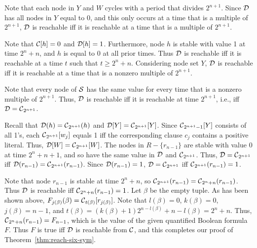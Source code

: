\smallskip

Note that each node in $Y$ and $W$ cycles with a period that divides $2^{n+1}$.
Since $\mbox{$\mathcal{D}$}$ has all nodes in $Y$ equal to 0, 
and this only occurs at a time that is a multiple of $2^{n+1}$,
$\mbox{$\mathcal{D}$}$ is reachable  iff it is reachable at a time that is a multiple of $2^{n+1}$.

Note that $\mbox{$\mathcal{C}$}[h]=0$ and $\mbox{$\mathcal{D}$}[h]=1$.  Furthermore, node $h$ is
stable with value 1 at time $2^n+n$, and $h$ is equal to 0 at all
prior times.  Thus $\mbox{$\mathcal{D}$}$ is reachable iff it is reachable at a
time $t$ such that $t \geq 2^n+n$.  Considering node set $Y$, $\mbox{$\mathcal{D}$}$
is reachable iff it is reachable  at a time that is a nonzero
multiple of $2^{n+1}$.

Note that every node of $\mbox{$\mathcal{S}$}$ 
has the same value for every time that is a  nonzero multiple of $2^{n+1}$.
Thus, $\mbox{$\mathcal{D}$}$ is reachable  iff it is reachable at time $2^{n+1}$,
i.e., iff $\mbox{$\mathcal{D}$} = \mbox{$\mathcal{C}$}_{2^{n+1}}$.

Recall that $\mbox{$\mathcal{D}$}(h) = \mbox{$\mathcal{C}$}_{2^{n+1}}(h)$ and $\mbox{$\mathcal{D}$}[Y] = \mbox{$\mathcal{C}$}_{2^{n+1}}[Y]$.
Since $\mbox{$\mathcal{C}$}_{2^{n+1}-1}[Y]$ consists of all 1's,
each $\mbox{$\mathcal{C}$}_{2^{n+1}}[w_j]$ equals 1 iff the corresponding clause $c_j$ contains a positive literal.
Thus, $\mbox{$\mathcal{D}$}[W] = \mbox{$\mathcal{C}$}_{2^{n+1}}[W]$.
The nodes in $R - \{r_{n-1}\}$ are stable with value 0 at time $2^n+n+1$,
and so have the same value in $\mbox{$\mathcal{D}$}$ and $\mbox{$\mathcal{C}$}_{2^{n+1}}$.
Thus, $\mbox{$\mathcal{D}$} = \mbox{$\mathcal{C}$}_{2^{n+1}}$ iff $\mbox{$\mathcal{D}$}(r_{n-1}) = \mbox{$\mathcal{C}$}_{2^{n+1}}(r_{n-1})$.
Since $\mbox{$\mathcal{D}$}(r_{n-1}) = 1$, $\mbox{$\mathcal{D}$} = \mbox{$\mathcal{C}$}_{2^{n+1}}$ iff
$\mbox{$\mathcal{C}$}_{2^{n+1}}(r_{n-1}) = 1$.

Note that node $r_{n-1}$ is stable at  time $2^n+n$,
so $ \mbox{$\mathcal{C}$}_{2^{n+1}}(r_{n-1}) = \mbox{$\mathcal{C}$}_{2^n+n}(r_{n-1})$.
Thus  $\mbox{$\mathcal{D}$}$ is reachable iff $\mbox{$\mathcal{C}$}_{2^n+n}(r_{n-1}) = 1$.
Let $\beta$ be the empty tuple.
As has been shown above,
$F_{j(\beta)}(\beta) =\mbox{$\mathcal{C}$}_{t(\beta)}[r_{j(\beta)}]$.
Note that $l(\beta) = 0$, $k(\beta) = 0$, $j(\beta) = n-1$,
and $t(\beta) = (k(\beta)+1) 2^{n-l(\beta)} +n -l(\beta) = 2^n+n$. 
Thus, $\mbox{$\mathcal{C}$}_{2^n+n}(r_{n-1}) = F_{n-1}$, which is the value of the given quantified Boolean formula $F$.
Thus $F$ is true iff $\mbox{$\mathcal{D}$}$ is reachable from $\mbox{$\mathcal{C}$}$,
and this completes our proof of Theorem~\ref{thm:reach-six-sym}. \QED

